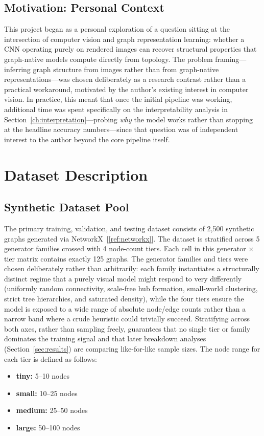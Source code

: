 \documentclass[11pt,letterpaper]{article}
\numberwithin{equation}{section}
\numberwithin{figure}{section}
\numberwithin{table}{section}
\begin{document}
\subsection{Motivation: Personal Context}
This project began as a personal exploration of a question sitting at the intersection of computer vision and graph representation learning: whether a CNN operating purely on rendered images can recover structural properties that graph-native models compute directly from topology. The problem framing---inferring graph structure from images rather than from graph-native representations---was chosen deliberately as a research contrast rather than a practical workaround, motivated by the author's existing interest in computer vision. In practice, this meant that once the initial pipeline was working, additional time was spent specifically on the interpretability analysis in Section~\ref{ch:interpretation}---probing \emph{why} the model works rather than stopping at the headline accuracy numbers---since that question was of independent interest to the author beyond the core pipeline itself.

\section{Dataset Description}
\label{sec:dataset}

\subsection{Synthetic Dataset Pool}
The primary training, validation, and testing dataset consists of 2,500 synthetic graphs generated via NetworkX~[\ref{ref:networkx}]. The dataset is stratified across 5 generator families crossed with 4 node-count tiers. Each cell in this generator $\times$ tier matrix contains exactly 125 graphs. The generator families and tiers were chosen deliberately rather than arbitrarily: each family instantiates a structurally distinct regime that a purely visual model might respond to very differently (uniformly random connectivity, scale-free hub formation, small-world clustering, strict tree hierarchies, and saturated density), while the four tiers ensure the model is exposed to a wide range of absolute node/edge counts rather than a narrow band where a crude heuristic could trivially succeed. Stratifying across both axes, rather than sampling freely, guarantees that no single tier or family dominates the training signal and that later breakdown analyses (Section~\ref{sec:results}) are comparing like-for-like sample sizes.
The node range for each tier is defined as follows:
\begin{itemize}
    \item \textbf{tiny:} 5--10 nodes
    \item \textbf{small:} 10--25 nodes
    \item \textbf{medium:} 25--50 nodes
    \item \textbf{large:} 50--100 nodes
\end{itemize}
\end{document}
